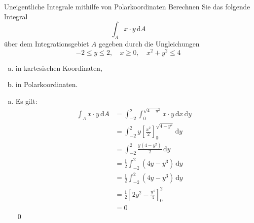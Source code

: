 \documentclass[german]{../spicker}
\renewcommand{\d}{\,\mathrm{d}}
\begin{document}
\begin{example}{Uneigentliche Integrale mithilfe von Polarkoordinaten}
    Berechnen Sie das folgende Integral
    $$
        \int_A x\cdot y \d A
    $$
    über dem Integrationsgebiet $A$ gegeben durch die Ungleichungen
    $$
        -2 \leq y \leq 2, \quad x \geq 0, \quad x^2 + y^2 \leq 4
    $$
    \begin{enumerate}[a)]
        \item in kartesischen Koordinaten,
        \item in Polarkoordinaten.
    \end{enumerate}

    \exampleseparator

    \begin{enumerate}[a)]
        \item
              Es gilt:
              $$
                  \begin{aligned}
                      \int_A x\cdot y \d A & = \int_{-2}^2 \int^{\sqrt{4-y^2}}_0 x\cdot y \d x \d y             \\
                                           & = \int_{-2}^2 y \left[ \frac{x^2}{2} \right]^{\sqrt{4-y^2}}_0 \d y \\
                                           & = \int_{-2}^2 \frac{y(4-y^2)}{2} \d y                              \\
                                           & = \frac{1}{2}\int_{-2}^2 (4y-y^3) \d y                             \\
                                           & = \frac{1}{2}\int_{-2}^2 (4y-y^3) \d y                             \\
                                           & = \frac{1}{2}\left[2y^2-\frac{y^4}{4}\right]_{0}^2                 \\
                                           & = 0
                  \end{aligned}
              $$\qed
    \end{enumerate}
\end{example}
\end{document}
